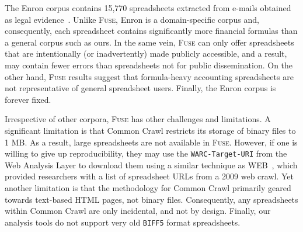 \documentclass[conference]{IEEEtran}
\begin{document}
The Enron corpus contains 15,770 spreadsheets extracted from e-mails obtained as legal evidence~\cite{Hermans2015}. Unlike \textsc{Fuse}, Enron is a domain-specific corpus and, consequently, each spreadsheet contains significantly more financial formulas than a general corpus such as ours. In the same vein, \textsc{Fuse} can only offer spreadsheets that are intentionally (or inadvertently) made publicly accessible, and a result, may contain fewer errors than spreadsheets not for public dissemination. On the other hand, \textsc{Fuse} results suggest that formula-heavy accounting spreadsheets are not representative of general spreadsheet users. Finally, the Enron corpus is forever fixed.

Irrespective of other corpora, \textsc{Fuse} has other challenges and limitations. A significant limitation is that Common Crawl restricts its storage of binary files to 1 MB. As a result, large spreadsheets are not available in \textsc{Fuse}. However, if one is willing to give up reproducibility, they may use the \texttt{WARC-Target-URI} from the Web Analysis Layer to download them using a similar technique as WEB~\cite{Chen2013}, which provided researchers with a list of spreadsheet URLs from a 2009 web crawl. Yet another limitation is that the methodology for Common Crawl primarily geared towards text-based HTML pages, not binary files. Consequently, any spreadsheets within Common Crawl are only incidental, and not by design. Finally, our analysis tools do not support very old \texttt{BIFF5} format spreadsheets.




\end{document}
